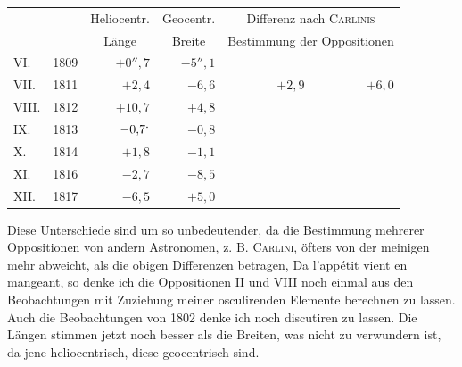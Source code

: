 \begin{center}
\begingroup\small\setlength{\tabcolsep}{5pt}
\begin{tabular}{@{}lr r r r r@{}}
&&\multicolumn{1}{c}{Heliocentr.}&\multicolumn{1}{c}{Geocentr.}&\multicolumn{2}{c}{Differenz nach \textsc{Carlinis}}\\
&&\multicolumn{1}{c}{Länge}&\multicolumn{1}{c}{Breite}&\multicolumn{2}{c}{Bestimmung der Oppositionen}\\[3pt]
VI.&1809&\(+0''{,}7\)&\(-5''{,}1\)&&\\
VII.&1811&\(+2{,}4\)&\(-6{,}6\)&\(+2{,}9\)&\(+6{,}0\)\\
VIII.&1812&\(+10{,}7\)&\(+4{,}8\)&&\\
IX.&1813&\(-0{,}7\mathpunct{\raisebox{1ex}{.}}\)&\(-0{,}8\)&&\\
X.&1814&\(+1{,}8\)&\(-1{,}1\)&&\\
XI.&1816&\(-2{,}7\)&\(-8{,}5\)&&\\
XII.&1817&\(-6{,}5\)&\(+5{,}0\)&&
\end{tabular}
\endgroup
\end{center}
\par Diese Unterschiede sind um so unbedeutender, da die Bestimmung mehrerer Oppositionen von andern Astronomen, z. B. \textsc{Carlini}, öfters von der meinigen mehr abweicht, als die obigen Differenzen betragen, Da l’appétit vient en mangeant, so denke ich die Oppositionen II und VIII noch einmal aus den Beobachtungen mit Zuziehung meiner osculirenden Elemente berechnen zu lassen. Auch die Beobachtungen von 1802 denke ich noch discutiren zu lassen. Die Längen stimmen jetzt noch besser als die Breiten, was nicht zu verwundern ist, da jene heliocentrisch, diese geocentrisch sind.
\par
